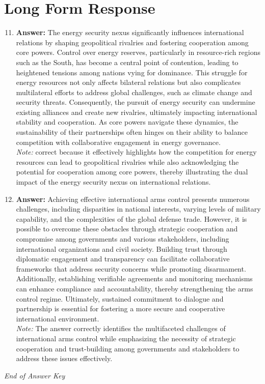 \documentclass[12pt]{article}
\begin{document}
\section*{Long Form Response}
\begin{enumerate}[label=\arabic*.]
\setcounter{enumi}{10}
\item \textbf{Answer:} The energy security nexus significantly influences international relations by shaping geopolitical rivalries and fostering cooperation among core powers. Control over energy reserves, particularly in resource-rich regions such as the South, has become a central point of contention, leading to heightened tensions among nations vying for dominance. This struggle for energy resources not only affects bilateral relations but also complicates multilateral efforts to address global challenges, such as climate change and security threats. Consequently, the pursuit of energy security can undermine existing alliances and create new rivalries, ultimately impacting international stability and cooperation. As core powers navigate these dynamics, the sustainability of their partnerships often hinges on their ability to balance competition with collaborative engagement in energy governance.
\\ \textit{Note:} correct because it effectively highlights how the competition for energy resources can lead to geopolitical rivalries while also acknowledging the potential for cooperation among core powers, thereby illustrating the dual impact of the energy security nexus on international relations.
\item \textbf{Answer:} Achieving effective international arms control presents numerous challenges, including disparities in national interests, varying levels of military capability, and the complexities of the global defense trade. However, it is possible to overcome these obstacles through strategic cooperation and compromise among governments and various stakeholders, including international organizations and civil society. Building trust through diplomatic engagement and transparency can facilitate collaborative frameworks that address security concerns while promoting disarmament. Additionally, establishing verifiable agreements and monitoring mechanisms can enhance compliance and accountability, thereby strengthening the arms control regime. Ultimately, sustained commitment to dialogue and partnership is essential for fostering a more secure and cooperative international environment.
\\ \textit{Note:} The answer correctly identifies the multifaceted challenges of international arms control while emphasizing the necessity of strategic cooperation and trust-building among governments and stakeholders to address these issues effectively.
\end{enumerate}

\vfill
\noindent\textit{End of Answer Key}
\end{document}
